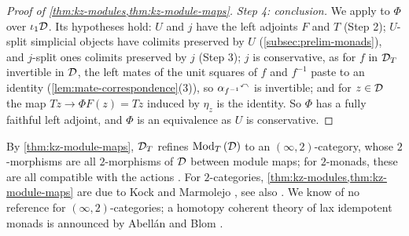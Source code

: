 \begin{proof}[Proof of \cref{thm:kz-modules,thm:kz-module-maps}]
\emph{Step 4: conclusion.} We apply \cite[Cor.~4.7.3.16]{ha} to $\Phi$ over
$\iota_{1}\mathcal{D}$. Its hypotheses hold: $U$ and $j$ have the left adjoints $F$ and
$T$ (Step 2); $U$-split simplicial objects have colimits preserved by $U$
(\cref{subsec:prelim-monads}), and $j$-split ones colimits preserved by $j$
(Step 3); $j$ is conservative, as for $f$ in $\mathcal{D}_{T}$ invertible in $\mathcal{D}$, the
left mates of the unit squares of $f$ and $f^{-1}$ paste to an identity
(\cref{lem:mate-correspondence}(3)), so
${\alpha_{f^{-1}}}^{\curvearrowleft}$
is invertible; and for $z \in \mathcal{D}$ the map
$Tz \to \Phi F(z) = Tz$
induced by $\eta_{z}$ is the identity. So $\Phi$ has a fully faithful left
adjoint, and $\Phi$ is an equivalence as $U$ is conservative.
\end{proof}

\begin{rmk}
\label{rmk:kz-literature}
%
By \cref{thm:kz-module-maps}, $\mathcal{D}_{T}$ refines ${\operatorname{Mod}_{T}\left(\mathcal{D}\right)}$ to an
$(\infty,2)$-category, whose $2$-morphisms are all $2$-morphisms of $\mathcal{D}$ between
module maps; for $2$-monads, these are all compatible with the actions
\cite[Prop.~6.4]{kellylack1997propertylike}.
For $2$-categories, \cref{thm:kz-modules,thm:kz-module-maps} are due to Kock
\cite{kock1995monads} and Marmolejo \cite[Thm.~10.7]{marmolejo1997doctrines},
see also \cite[Thm.~6.2, Cor.~6.3]{kellylack1997propertylike}. We know of no
reference for $(\infty,2)$-categories; a homotopy coherent theory of lax
idempotent monads is announced by Abell\'an and Blom
\cite[Introduction]{abellan2026bifibrations}.
\end{rmk}
